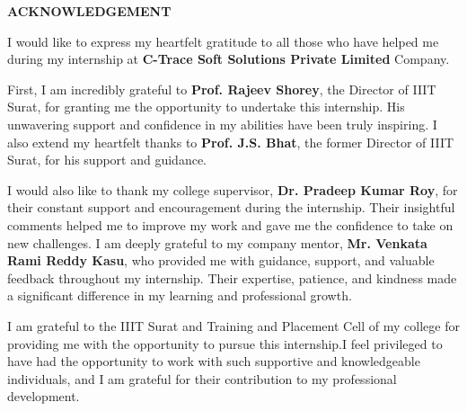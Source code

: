 \thispagestyle{plain}

\begin{center}
 \Large {\textbf \uppercase{Acknowledgement}}
\end{center}

\vspace{3\baselineskip}
\justify
I would like to express my heartfelt gratitude to all those who have helped me during my internship at \textbf{C-Trace Soft Solutions Private Limited} Company.

First, I am incredibly grateful to \textbf{Prof. Rajeev Shorey}, the Director of IIIT
Surat, for granting me the opportunity to undertake this internship.
His unwavering support and confidence in my abilities have been truly inspiring.
I also extend my heartfelt thanks to \textbf{Prof. J.S. Bhat}, the former Director of IIIT Surat, for his
support and guidance.

I would also like to thank my college supervisor, \textbf{Dr. Pradeep Kumar Roy}, for their constant support and encouragement during the internship.
Their insightful comments helped me to improve my work and gave me the confidence to take on new challenges.
I am deeply grateful to my company mentor,\textbf{ Mr. Venkata Rami Reddy Kasu}, who provided me with guidance, support, and valuable feedback throughout my internship.
Their expertise, patience, and kindness made a significant difference in my learning and professional growth.

I am grateful to the IIIT Surat and Training and Placement Cell of my college for providing me with the opportunity to pursue this internship.I feel privileged to have had the opportunity to work with such supportive and knowledgeable individuals, and I am grateful for their contribution to my professional development.


 
